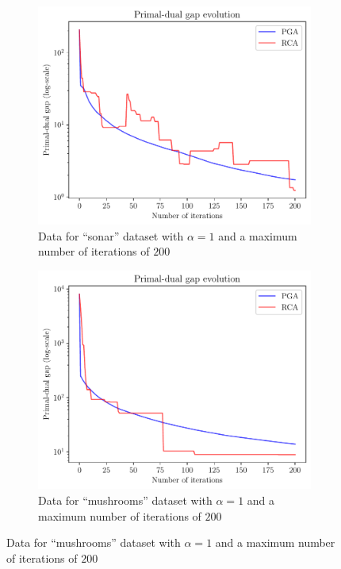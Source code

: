 \documentclass{article}
\begin{document}
\begin{itemize}
           \begin{figure}[h!]
                \centering
                \begin{subfigure}{0.45\textwidth}
                    \centering
                    \includegraphics[width=\linewidth]{../code/plots/tiny_pd_plot.pdf}
                    \caption{Data for ``sonar'' dataset with $\alpha = 1$ and
                    a maximum number of iterations of $200$}
                    \label{pd_sonar}
                \end{subfigure}
                \hfill
                \begin{subfigure}{0.45\textwidth}
                    \centering
                    \includegraphics[width=\linewidth]{../code/plots/small_pd_plot.pdf}
                    \caption{Data for ``mushrooms'' dataset with $\alpha = 1$ and
                    a maximum number of iterations of $200$}
                    \label{pd_mushrooms}
                \end{subfigure}
                \label{fig:pd}
           \end{figure}
            

\end{itemize}
\end{document}
